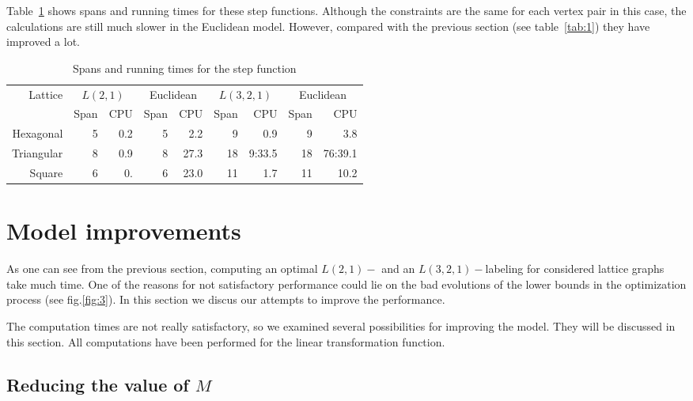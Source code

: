 \documentclass[smallextended]{svjour3}
\begin{document}
Table~\ref{tab:3} shows spans and running times for these step functions. 
Although the constraints are the same for each vertex pair in this case, the calculations 
are still much slower in the Euclidean model. However, compared with the 
previous section (see table~\ref{tab:1}) they have improved a lot. 

\begin{table}[h] 
\begin{center} 
\renewcommand{\arraystretch}{1.3} 
\renewcommand{\tabcolsep}{8pt} 
\begin{tabular}{|r||r|r|r|r||r|r|r|r|} 
\hline 
Lattice  & \multicolumn{2}{c|}{$L(2,1)$} & \multicolumn{2}{c||}{Euclidean} & 
 \multicolumn{2}{c|}{$L(3,2,1)$} & \multicolumn{2}{c|}{Euclidean}\\ 
  & Span & CPU & Span & CPU & Span & CPU & Span & CPU\\ 
\hline 
Hexagonal & 5 & 0.2 & 5 & 2.2 & 9 & 0.9 & 9 & 3.8 \\ 
\hline 
Triangular  & 8 & 0.9 & 8 & 27.3 & 18 & 9:33.5 & 18 & 76:39.1 \\ 
\hline 
Square     & 6 & 0. & 6  & 23.0 & 11 & 1.7 & 11 & 10.2  \\ 
\hline 
\end{tabular} 
\end{center} 
\caption{Spans and running times for the step function}\label{tab:3} 
\end{table} 

\section{Model improvements} 

As one can see from the previous section, computing an optimal $L(2,1)-$ and an $L(3,2,1)-$labeling for considered lattice graphs take much time. One 
of the reasons for not satisfactory performance could lie on the bad evolutions of the lower bounds in the optimization process (see fig.\ref{fig:3}). In this section we discus our attempts to improve the performance. 

The computation times are not really satisfactory, so we examined several 
possibilities for improving the model. They will be discussed in this section. 
All computations have been performed for the linear transformation function. 

 

\FloatBarrier 

\subsection{Reducing the value of $M$} 
\end{document}
